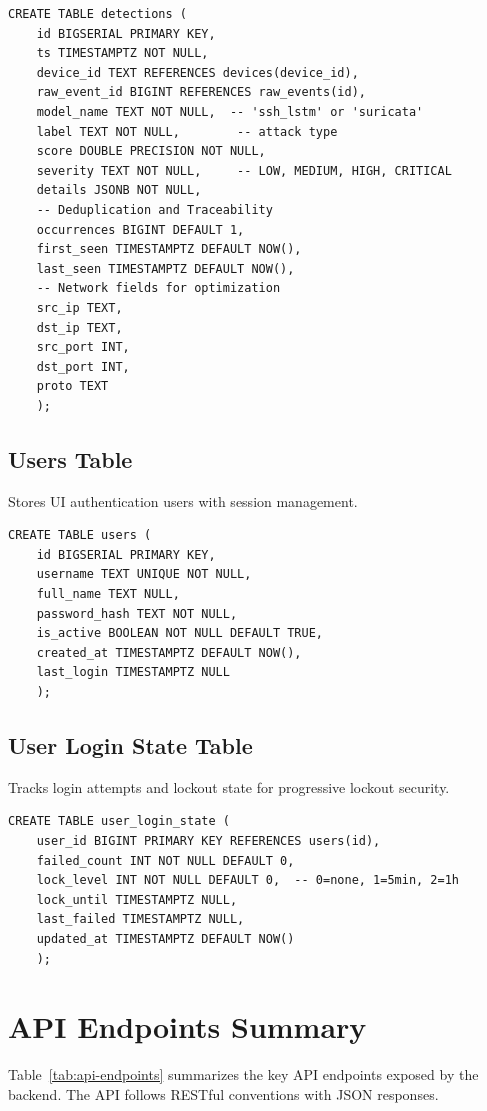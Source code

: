 \documentclass[12pt,a4paper]{report} %
\begin{document}
\begin{lstlisting}[style=python,caption=Detections Table Schema]
	CREATE TABLE detections (
	id BIGSERIAL PRIMARY KEY,
	ts TIMESTAMPTZ NOT NULL,
	device_id TEXT REFERENCES devices(device_id),
	raw_event_id BIGINT REFERENCES raw_events(id),
	model_name TEXT NOT NULL,  -- 'ssh_lstm' or 'suricata'
	label TEXT NOT NULL,        -- attack type
	score DOUBLE PRECISION NOT NULL,
	severity TEXT NOT NULL,     -- LOW, MEDIUM, HIGH, CRITICAL
	details JSONB NOT NULL,
	-- Deduplication and Traceability
	occurrences BIGINT DEFAULT 1,
	first_seen TIMESTAMPTZ DEFAULT NOW(),
	last_seen TIMESTAMPTZ DEFAULT NOW(),
	-- Network fields for optimization
	src_ip TEXT,
	dst_ip TEXT,
	src_port INT,
	dst_port INT,
	proto TEXT
	);
\end{lstlisting}

\subsection{Users Table}
Stores UI authentication users with session management.

\begin{lstlisting}[style=python,caption=Users Table Schema]
	CREATE TABLE users (
	id BIGSERIAL PRIMARY KEY,
	username TEXT UNIQUE NOT NULL,
	full_name TEXT NULL,
	password_hash TEXT NOT NULL,
	is_active BOOLEAN NOT NULL DEFAULT TRUE,
	created_at TIMESTAMPTZ DEFAULT NOW(),
	last_login TIMESTAMPTZ NULL
	);
\end{lstlisting}

\subsection{User Login State Table}
Tracks login attempts and lockout state for progressive lockout security.

\begin{lstlisting}[style=python,caption=User Login State Table Schema]
	CREATE TABLE user_login_state (
	user_id BIGINT PRIMARY KEY REFERENCES users(id),
	failed_count INT NOT NULL DEFAULT 0,
	lock_level INT NOT NULL DEFAULT 0,  -- 0=none, 1=5min, 2=1h
	lock_until TIMESTAMPTZ NULL,
	last_failed TIMESTAMPTZ NULL,
	updated_at TIMESTAMPTZ DEFAULT NOW()
	);
\end{lstlisting}

\section{API Endpoints Summary}
\label{sec:api-summary}
Table~\ref{tab:api-endpoints} summarizes the key API endpoints exposed by the backend. The API follows RESTful conventions with JSON responses.
\end{document}
